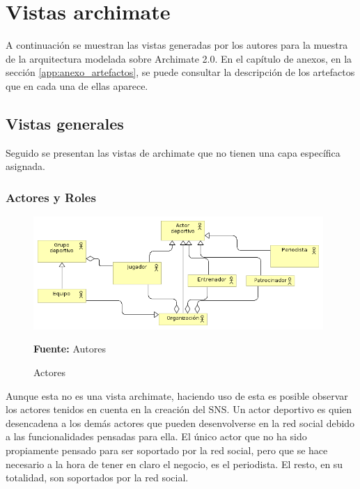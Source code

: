 \section{Vistas archimate}

A continuación se muestran las vistas generadas por los autores para la muestra de la arquitectura modelada sobre Archimate 2.0. En el capítulo de anexos, en la sección \ref{app:anexo_artefactos}, se puede consultar la descripción de los artefactos que en cada una de ellas aparece.

\subsection{Vistas generales}

Seguido se presentan las vistas de archimate que no tienen una capa específica asignada.

\subsubsection{Actores y Roles}

\begin{figure}[!htb]
  \begin{center}
    \includegraphics[width=11cm]{./imagenes/Archimate/vistas/generales/actores.png}
    \caption{Actores}
    \label{fig:Actores}
    \textbf{Fuente:}  Autores
  \end{center}
\end{figure}

Aunque esta no es una vista archimate, haciendo uso de esta es posible observar los actores tenidos en cuenta en la creación del SNS. Un actor deportivo es quien desencadena a los demás actores que pueden desenvolverse en la red social debido a las funcionalidades pensadas para ella. El único actor que no ha sido propiamente pensado para ser soportado por la red social, pero que se hace necesario a la hora de tener en claro el negocio, es el periodista. El resto, en su totalidad, son soportados por la red social.

